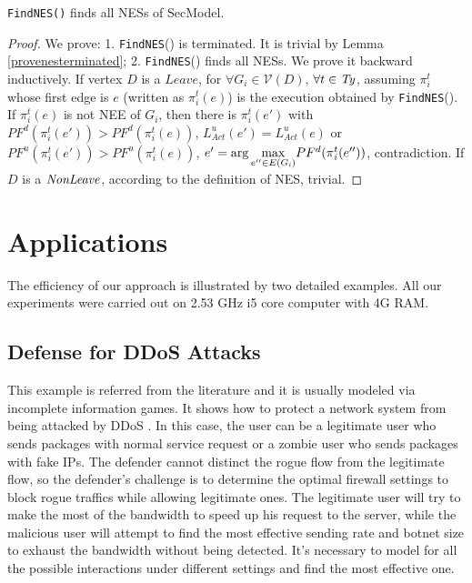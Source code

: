 \documentclass[10pt, conference, compsocconf]{IEEEtran}
\begin{document}
\begin{Theorem}
\label{correctness}
\verb"FindNES()" finds all {\rm NESs} of {\rm SecModel}.
\end{Theorem}
\begin{proof}
We prove:
1. \verb"FindNES"() is terminated. It is trivial
by Lemma \ref{provenesterminated};
2. \verb"FindNES"() finds all NESs. We prove it backward inductively. If vertex $D$ is a $Leave$, for $\forall G_{i}\in \mathcal{V}(D)$, $\forall t\in {\it Ty}$, assuming $\pi_{\textit{i}}^t$ whose first edge is $e$ (written as $\pi_{\textit{i}}^t(e)$) is the execution obtained by \verb"FindNES"(). If $\pi_{\textit{i}}^t(e)$ is not \textrm{NEE} of $G_{\textit{i}}$, then there is $\pi_{\textit{i}}^{t}(e')$ with
$PF^d(\pi_{\textit{i}}^{t}(e'))> PF^d(\pi_{\textit{i}}^{t}(e))$, $L_{\textit{Act}}^u(e')= L_{\textit{Act}}^u(e)$ or
$PF^u(\pi_{\textit{i}}^{t}(e'))> PF^u(\pi_{\textit{i}}^{t}(e))$, $e'=\arg\underset{e''\in E(G_{\it i})}{\max} PF^d(\pi_{\textit{i}}^{t}(e''))$, contradiction.
If $D$ is a ${\it NonLeave}$, according to the definition of NES, trivial.
\end{proof}


\section{Applications}
The efficiency of our approach is illustrated by two detailed examples.
All our experiments were carried out on 2.53 GHz i5 core computer with 4G RAM.

\subsection{Defense for DDoS Attacks}
This example is referred from the literature \cite{harkeerat} and it is usually modeled via incomplete information games.
It shows how to protect a network system from being attacked by DDoS \cite{david}.
In this case, the user can be a legitimate user who sends packages with normal service request or a zombie user who sends packages with fake IPs. The defender cannot distinct the rogue flow from the legitimate flow, so the defender's challenge is to determine the optimal firewall settings to block rogue traffics while allowing legitimate ones.
The legitimate user will try to make the most of the bandwidth to speed up his request to the server, while the malicious user will attempt to find the most effective sending rate and botnet size to exhaust the bandwidth without being detected.
It's necessary to model for all the possible interactions under different settings and find the most effective one.
\end{document}

